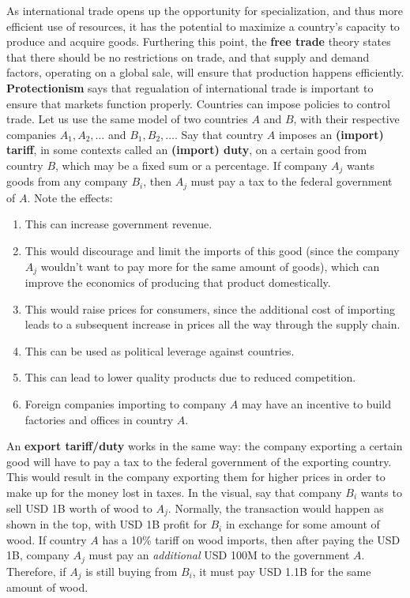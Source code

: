 \documentclass{article}
\begin{document}
    As international trade opens up the opportunity for specialization, and thus more efficient use of resources, it has the potential to maximize a country's capacity to produce and acquire goods. Furthering this point, the \textbf{free trade} theory states that there should be no restrictions on trade, and that supply and demand factors, operating on a global sale, will ensure that production happens efficiently. \textbf{Protectionism} says that regualation of international trade is important to ensure that markets function properly. Countries can impose policies to control trade. Let us use the same model of two countries $A$ and $B$, with their respective companies $A_1, A_2, \ldots$ and $B_1, B_2, \ldots$.
    Say that country $A$ imposes an \textbf{(import) tariff}, in some contexts called an \textbf{(import) duty}, on a certain good from country $B$, which may be a fixed sum or a percentage. If company $A_j$ wants goods from any company $B_i$, then $A_j$ must pay a tax to the federal government of $A$. Note the effects:
    \begin{enumerate}
      \item This can increase government revenue.
      \item This would discourage and limit the imports of this good (since the company $A_j$ wouldn't want to pay more for the same amount of goods), which can improve the economics of producing that product domestically.
      \item This would raise prices for consumers, since the additional cost of importing leads to a subsequent increase in prices all the way through the supply chain.
      \item This can be used as political leverage against countries.
      \item This can lead to lower quality products due to reduced competition.
      \item Foreign companies importing to company $A$ may have an incentive to build factories and offices in country $A$.
    \end{enumerate}

    An \textbf{export tariff/duty} works in the same way: the company exporting a certain good will have to pay a tax to the federal government of the exporting country. This would result in the company exporting them for higher prices in order to make up for the money lost in taxes.
    In the visual, say that company $B_i$ wants to sell USD 1B worth of wood to $A_j$. Normally, the transaction would happen as shown in the top, with USD 1B profit for $B_i$ in exchange for some amount of wood. If country $A$ has a 10\% tariff on wood imports, then after paying the USD 1B, company $A_j$ must pay an \textit{additional} USD 100M to the government $A$. Therefore, if $A_j$ is still buying from $B_i$, it must pay USD 1.1B for the same amount of wood.
    \begin{center}
    \end{center}
\end{document}
